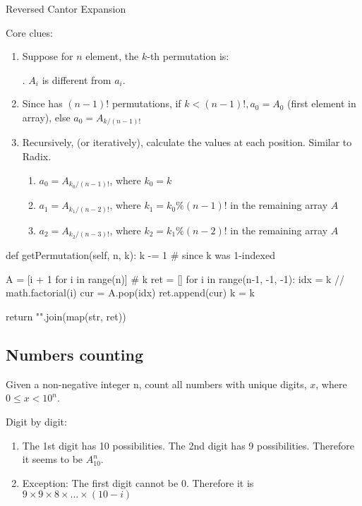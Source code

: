 Reversed Cantor Expansion

Core clues:
\begin{enumerate}
\item {}

Suppose for $n$ element, the $k$-th permutation is:

. $A_i$ is different from $a_i$.
\item {} Since \pyinline{[a1, a3, ..., an-1]} has $(n-1)!$ permutations,
if $k < (n-1)!, a_0 = A_0$ (first element in array), else $a_0 = A_{k/(n-1)!}$

\item Recursively, (or iteratively), calculate the values at each position. Similar to Radix. 
\begin{enumerate}
\item $a_0 = A_{k_0/(n-1)!}$, where $k_0 = k$
\item $a_1 = A_{k_1/(n-2)!}$, where $k_1 = k_0\%(n-1)!$ in the remaining array $A$
\item $a_2 = A_{k_2/(n-3)!}$, where $k_2 = k_1\%(n-2)!$ in the remaining array $A$
\end{enumerate}
\end{enumerate}
\begin{python}
def getPermutation(self, n, k):
    k -= 1  # since k was 1-indexed

    A = [i + 1 for i in range(n)]
    # k %
    ret = []
    for i in range(n-1, -1, -1):
        idx = k // math.factorial(i) 
        cur = A.pop(idx)
        ret.append(cur)
        k = k %

    return "".join(map(str, ret))
\end{python}

\subsection{Numbers counting}
 Given a non-negative integer n, count all numbers with unique digits, $x$, where $0 \leq x < 10^n$.

Digit by digit: 
\begin{enumerate}
\item The 1st digit has 10 possibilities. The 2nd digit has 9 possibilities. Therefore it seems to be $A_{10}^n$.
\item Exception: The first digit cannot be 0. Therefore it is $9\times 9\times 8\times ...\times (10-i)$
\end{enumerate}



